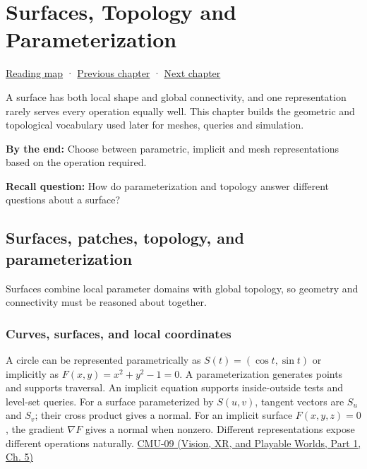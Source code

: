\chapter{Surfaces, Topology and Parameterization}\label{03-visual-computing-i-ch002-surfaces-topology-and-parameterization}\hypertarget{03-visual-computing-i-ch002}{}\label{stagechapter:03-visual-computing-i-ch002}

\hypertarget{03-visual-computing-i-ch002-surfaces-topology-and-parameterization}{}

\hyperref[volume-reading-map]{Reading map} · \hyperref[03-visual-computing-i-ch001-from-worlds-to-images-and-inference]{Previous chapter} · \hyperref[03-visual-computing-i-ch003-lens-optics-and-image-formation]{Next chapter}

A surface has both local shape and global connectivity, and one representation rarely serves every operation equally well. This chapter builds the geometric and topological vocabulary used later for meshes, queries and simulation.

\textbf{By the end:} Choose between parametric, implicit and mesh representations based on the operation required.

\textbf{Recall question:} How do parameterization and topology answer different questions about a surface?

\section{Surfaces, patches, topology, and parameterization}\label{03-visual-computing-i-ch002-surfaces-patches-topology-and-parameterization}

\hypertarget{03-visual-computing-i-ch002-surfaces-patches-topology-and-parameterization}{}

Surfaces combine local parameter domains with global topology, so geometry and connectivity must be reasoned about together.

\subsection{Curves, surfaces, and local coordinates}\label{03-visual-computing-i-ch002-curves-surfaces-and-local-coordinates}

\hypertarget{03-visual-computing-i-ch002-curves-surfaces-and-local-coordinates}{}

A circle can be represented parametrically as \(S(t)=(\cos t,\sin t)\) or implicitly as \(F(x,y)=x^2+y^2-1=0\). A parameterization generates points and supports traversal. An implicit equation supports inside-outside tests and level-set queries. For a surface parameterized by \(S(u,v)\), tangent vectors are \(S_u\) and \(S_v\); their cross product gives a normal. For an implicit surface \(F(x,y,z)=0\), the gradient \(\nabla F\) gives a normal when nonzero. Different representations expose different operations naturally. \href{../07-Vision-XR-and-Playable-Worlds-P01/main.pdf\#nameddest=04-visual-computing-ii-ch036-cmu-09---introduction-to-geometry}{CMU-09 (Vision, XR, and Playable Worlds, Part 1, Ch. 5)}

